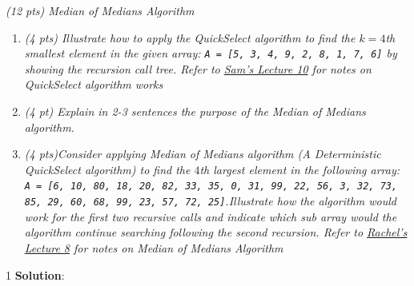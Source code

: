 \documentclass[9pt]{article}
\def\solutions{1}
\begin{document}
\fi

\newpage



\vspace{5mm}

\item{\itshape (12 pts) Median of Medians Algorithm
	}
	\begin{enumerate}%
	
	\item{\itshape
    (4 pts) Illustrate how to apply the QuickSelect algorithm to find the $k = 4$th smallest element in the given array: \texttt{A = [5, 3, 4, 9, 2, 8, 1, 7, 6]} by showing the recursion call tree. Refer to  \href{https://canvas.colorado.edu/courses/69354/files/28668920?wrap=1}{Sam's Lecture 10} for notes on QuickSelect algorithm works }
    
    \item{\itshape
    (4 pt) Explain in 2-3 sentences the purpose of the Median of Medians algorithm.}
	
	\item{ \itshape
(4 pts)Consider applying Median of Medians algorithm (A Deterministic QuickSelect algorithm) to find the $4$th largest element in the following array: \texttt{A = [6, 10, 80, 18, 20, 82, 33, 35, 0, 31, 99, 22, 56, 3, 32, 73, 85, 29, 60, 68, 99, 23, 57, 72, 25]}.Illustrate how the algorithm would work for the first two recursive calls and indicate which sub array would the algorithm continue searching following the second recursion. Refer to \href{https://canvas.colorado.edu/courses/69354/files/28587193?wrap=1}{Rachel's Lecture 8} for notes on Median of Medians Algorithm}
		\end{enumerate}
\if\solutions1
\vspace{3mm}
{\bf Solution}: \\
\end{document}
